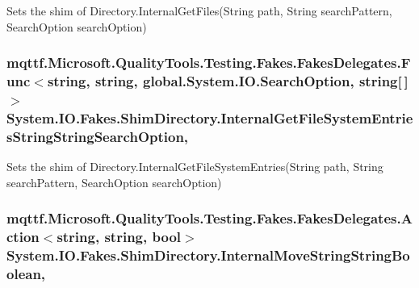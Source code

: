 Sets the shim of Directory.\-Internal\-Get\-Files(\-String path, String search\-Pattern, Search\-Option search\-Option)

\hypertarget{class_system_1_1_i_o_1_1_fakes_1_1_shim_directory_a847512d8fe34dbb0d81f38fafd626da0}{
\subsubsection[{Internal\-Get\-File\-System\-Entries\-String\-String\-Search\-Option}]{\setlength{\rightskip}{0pt plus 5cm}mqttf.\-Microsoft.\-Quality\-Tools.\-Testing.\-Fakes.\-Fakes\-Delegates.\-Func$<$string, string, global.\-System.\-I\-O.\-Search\-Option, string\mbox{[}$\,$\mbox{]}$>$ System.\-I\-O.\-Fakes.\-Shim\-Directory.\-Internal\-Get\-File\-System\-Entries\-String\-String\-Search\-Option\hspace{0.3cm}{\ttfamily [static]}, {\ttfamily [set]}}}\label{class_system_1_1_i_o_1_1_fakes_1_1_shim_directory_a847512d8fe34dbb0d81f38fafd626da0}


Sets the shim of Directory.\-Internal\-Get\-File\-System\-Entries(\-String path, String search\-Pattern, Search\-Option search\-Option)

\hypertarget{class_system_1_1_i_o_1_1_fakes_1_1_shim_directory_aa5254495e22c76168fcec80c75ea5591}{
\subsubsection[{Internal\-Move\-String\-String\-Boolean}]{\setlength{\rightskip}{0pt plus 5cm}mqttf.\-Microsoft.\-Quality\-Tools.\-Testing.\-Fakes.\-Fakes\-Delegates.\-Action$<$string, string, bool$>$ System.\-I\-O.\-Fakes.\-Shim\-Directory.\-Internal\-Move\-String\-String\-Boolean\hspace{0.3cm}{\ttfamily [static]}, {\ttfamily [set]}}}\label{class_system_1_1_i_o_1_1_fakes_1_1_shim_directory_aa5254495e22c76168fcec80c75ea5591}


